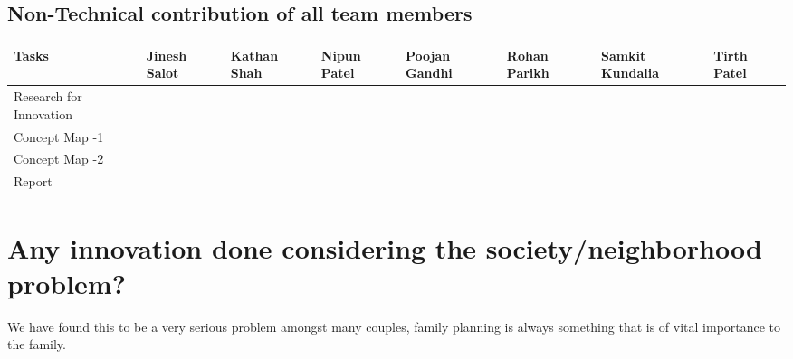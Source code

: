 \documentclass{article}
\begin{document}
\subsection{Non-Technical contribution of all team members }
\begin{table}[h]
		\begin{tabular}{|p{3.8154cm}|p{1.4154cm}|p{1.4154cm}|p{1.4154cm}|p{1.4154cm}|p{1.4154cm}|p{1.4154cm}|p{1.4154cm}|}
			\hline
			Tasks  & Jinesh Salot & Kathan Shah & Nipun Patel & Poojan Gandhi & Rohan Parikh & Samkit Kundalia & Tirth Patel \\ \hline
			Research for Innovation &      &       &        &          &     &       &         \\ \hline
			Concept Map -1 &      &       &        &          &     &       &         \\ \hline
			Concept Map -2 &      &       &        &          &     &       &       \\ \hline
			Report &      &       &        &          &     &       &       \\ \hline
		\end{tabular}
\end{table}


\section{Any innovation done considering the society/neighborhood problem?}
We have found this to be a very serious problem amongst many couples, family planning is always something that is of vital importance to the family. 
\end{document}

